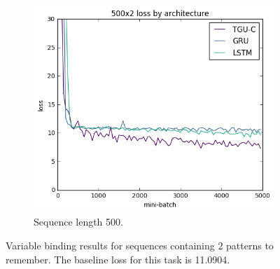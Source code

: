 \begin{figure}[htb]
\begin{subfigure}[t]{0.3\linewidth}
	\includegraphics[width=\linewidth]{exps/vbind/plots/500x2}
	\caption{Sequence length 500.}
\end{subfigure}

\caption[Variable binding results, two patterns]
{Variable binding results for sequences containing \(2\) patterns to remember. The baseline loss for this
task is 11.0904.}
\label{fig:vbindn2}
\end{figure}


